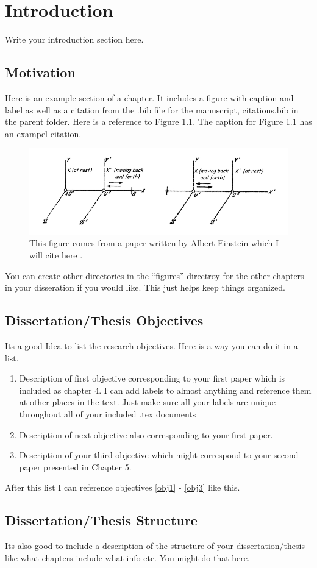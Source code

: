 \chapter{Introduction \label{chp1}}

Write your introduction section here.

\section{Motivation}

Here is an example section of a chapter. It includes a figure with caption and
label as well as a citation from the .bib file for the manuscript, citations.bib in the parent folder. Here is a reference to Figure \ref{exampleFig}.  The caption for
Figure \ref{exampleFig} has an exampel citation.

\begin{figure}[!ht]
    \centerline{\includegraphics[width=5.0in]{figures/chapter1/exampleFig.png}}
    \caption{This figure comes from a paper written by Albert Einstein which I
    will cite here \cite{einstein1916foundation}.  \label{exampleFig}}
\end{figure}

You can create other directories in the ``figures'' directroy for the other
chapters in your disseration if you would like. This just helps keep things
organized.


\section{Dissertation/Thesis Objectives}

Its a good Idea to list the research objectives. Here is a way you can do it
in a list.
\begin{enumerate}
        \item Description of first objective corresponding to your first paper
            which is included as chapter 4. I can add labels to almost anything
            and reference them at other places in the text. Just make sure all
            your labels are unique throughout all of your included .tex
            documents \label{obj1}
        \item Description of next objective also corresponding to your first
            paper. \label{obj2}
        \item Description of your third objective which might correspond to your
            second paper presented in Chapter 5. \label{obj3}
\end{enumerate}

After this list I can reference objectives \ref{obj1} - \ref{obj3} like this.

\section{Dissertation/Thesis Structure}

Its also good to include a description of the structure of your dissertation/thesis
like what chapters include what info etc. You might do that here.
